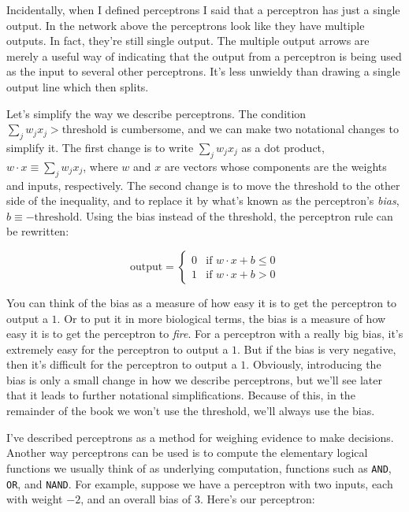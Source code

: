 Incidentally, when I defined perceptrons I said that a perceptron has just a single output. In the network above the perceptrons look like they have multiple outputs. In fact, they're still single output. The multiple output arrows are merely a useful way of indicating that the output from a perceptron is being used as the input to several other perceptrons. It's less unwieldy than drawing a single output line which then splits.


Let's simplify the way we describe perceptrons. The condition $\sum_j w_j x_j > \mbox{threshold}$ is cumbersome, and we can make two notational changes to simplify it. The first change is to write $\sum_j w_j x_j$ as a dot product, $w \cdot x \equiv \sum_j w_j x_j$, where $w$ and $x$ are vectors whose components are the weights and inputs, respectively. The second change is to move the threshold to the other side of the inequality, and to replace it by what's known as the perceptron's \emph{bias}, $b \equiv -\mbox{threshold}$. Using the bias instead of the threshold, the perceptron rule can be rewritten:

\begin{equation}
\mbox{output} = \left\{ \begin{array}{ll} 0 & \mbox{if } w\cdot x + b \leq 0 \\ 1 & \mbox{if } w\cdot x + b > 0 \end{array} \right.
\tag{2}
\end{equation}

\noindent You can think of the bias as a measure of how easy it is to get the perceptron to output a $1$. Or to put it in more biological terms, the bias is a measure of how easy it is to get the perceptron to \emph{fire}. For a perceptron with a really big bias, it's extremely easy for the perceptron to output a $1$. But if the bias is very negative, then it's difficult for the perceptron to output a $1$. Obviously, introducing the bias is only a small change in how we describe perceptrons, but we'll see later that it leads to further notational simplifications. Because of this, in the remainder of the book we won't use the threshold, we'll always use the bias.


I've described perceptrons as a method for weighing evidence to make decisions. Another way perceptrons can be used is to compute the elementary logical functions we usually think of as underlying computation, functions such as \texttt{AND}, \texttt{OR}, and \texttt{NAND}. For example, suppose we have a perceptron with two inputs, each with weight $-2$, and an overall bias of $3$. Here's our perceptron:

